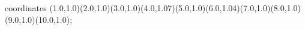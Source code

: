 					coordinates { (1.0,1.0)(2.0,1.0)(3.0,1.0)(4.0,1.07)(5.0,1.0)(6.0,1.04)(7.0,1.0)(8.0,1.0)(9.0,1.0)(10.0,1.0)};